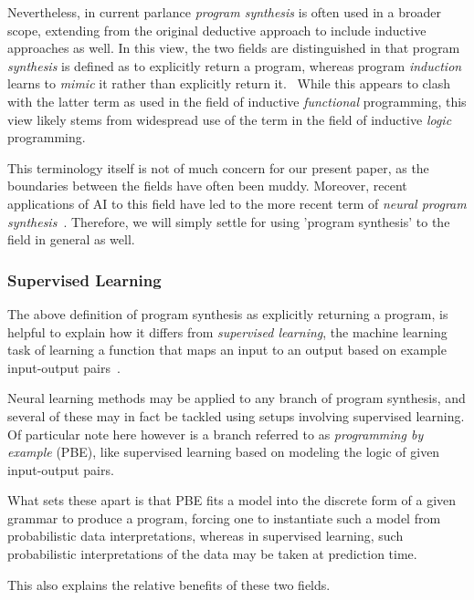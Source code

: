 \documentclass{article}
\begin{document}
Nevertheless, in current parlance \emph{program synthesis} is often used in a broader scope, extending from the original deductive approach to include inductive approaches as well. In this view, the two fields are distinguished in that program \emph{synthesis} is defined as to explicitly return a program, whereas program \emph{induction} learns to \emph{mimic} it rather than explicitly return it.~\citep{devlin2017robustfill,gulwani2017program,nps}
While this appears to clash with the latter term as used in the field of inductive \emph{functional} programming, this view likely stems from widespread use of the term in the field of inductive \emph{logic} programming.

This terminology itself is not of much concern for our present paper, as the boundaries between the fields have often been muddy.
Moreover, recent applications of AI to this field have led to the more recent term of \emph{neural program synthesis}~\citep{nps}. Therefore, we will simply settle for using 'program synthesis' to the field in general as well.

\subsubsection{Supervised Learning}

The above definition of program synthesis as explicitly returning a program,
is helpful to explain how it differs from \emph{supervised learning},
the machine learning task of learning a function that maps an input to an output based on example input-output pairs~\citep{russell2002artificial}.

Neural learning methods may be applied to any branch of program synthesis,
and several of these may in fact be tackled using setups involving supervised learning.
Of particular note here however is a branch referred to as \emph{programming by example} (PBE),
like supervised learning based on modeling the logic of given input-output pairs.

What sets these apart is that PBE fits a model into the discrete form of a given grammar to produce a program,
forcing one to instantiate such a model from probabilistic data interpretations,
whereas in supervised learning,
such probabilistic interpretations of the data may be taken at prediction time.

This also explains the relative benefits of these two fields.
\end{document}
